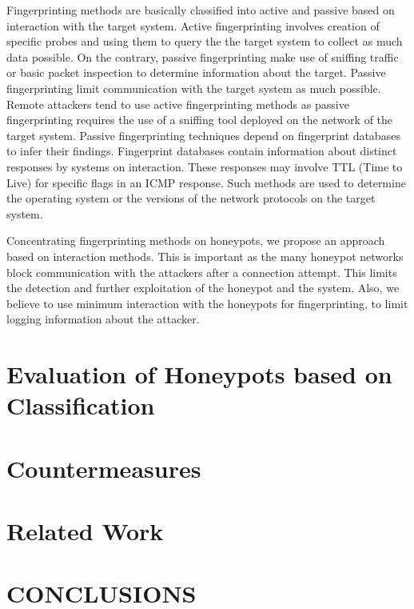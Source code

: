 \documentclass[letterpaper, 10 pt, conference]{ieeeconf}  %
\begin{document}
   Fingerprinting methods are basically classified into active and passive based on interaction with the target system. Active fingerprinting involves creation of specific probes and using them to query the the target system to collect as much data possible. On the contrary, passive fingerprinting  make use of sniffing traffic or basic packet inspection to determine information about the target. Passive fingerprinting limit communication with the target system as much possible. Remote attackers tend to use active fingerprinting methods as passive fingerprinting requires the use of a sniffing tool deployed on the network of the target system. Passive fingerprinting techniques depend on fingerprint databases to infer their findings. Fingerprint databases contain information about distinct responses by systems on interaction. These responses may involve TTL (Time to Live) for specific flags in an ICMP response. Such methods are used to determine the operating system or the versions of the network protocols on the target system.
   
   Concentrating fingerprinting methods on honeypots, we propose an approach based on interaction methods. This is important as the many honeypot networks block communication with the attackers after a connection attempt. This limits the detection and further exploitation of the honeypot and the system. Also, we believe to use minimum interaction with the honeypots for fingerprinting, to limit logging information about the attacker. 


 \section{Evaluation of Honeypots based on Classification}
 
 
 
 \section {Countermeasures}
 
 
 
 \section {Related Work}
 
 
 
\section{CONCLUSIONS}
\end{document}

